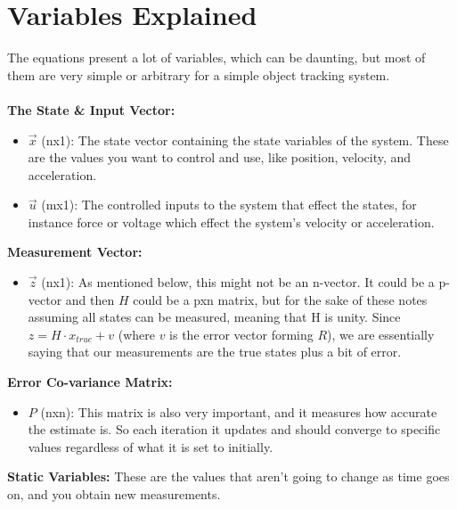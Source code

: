 \documentclass{article} %
\begin{document}
\section{Variables Explained}
The equations present a lot of variables, which can be daunting, but most of them are very simple or arbitrary for a simple object tracking system. \\\\
\textbf{The State \& Input Vector:}
\begin{itemize}
\item $\vec{x}$ (nx1): The state vector containing the state variables of the system. These are the values you want to control and use, like position, velocity, and acceleration. 
\item $\vec{u}$ (mx1): The controlled inputs to the system that effect the states, for instance force or voltage which effect the system's velocity or acceleration.
\end{itemize}
\textbf{Measurement Vector:}
\begin{itemize}
\item $\vec{z}$ (nx1): As mentioned below, this might not be an n-vector. It could be a p-vector and then $H$ could be a pxn matrix, but for the sake of these notes assuming all states can be measured, meaning that H is unity. Since $z = H \cdot x_{true} + v$ (where $v$ is the error vector forming $R$), we are essentially saying that our measurements are the true states plus a bit of error.
\end{itemize}
\textbf{Error Co-variance Matrix:}
\begin{itemize}
\item $P$ (nxn): This matrix is also very important, and it measures how accurate the estimate is. So each iteration it updates and should converge to specific values regardless of what it is set to initially.
\end{itemize}
\textbf{Static Variables:}
These are the values that aren't going to change as time goes on, and you obtain new measurements. 
\end{document}
